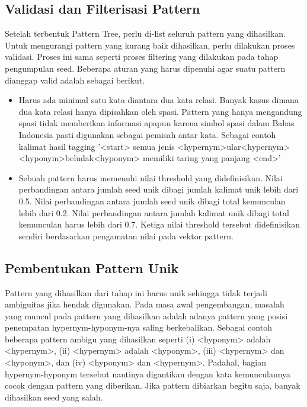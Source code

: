 \subsection{Validasi dan Filterisasi Pattern}
Setelah terbentuk Pattern Tree, perlu di-list seluruh pattern yang dihasilkan. Untuk mengurangi pattern yang kurang baik dihasilkan, perlu dilakukan proses validasi. Proses ini sama seperti proses filtering yang dilakukan pada tahap pengumpulan seed. Beberapa aturan yang harus dipenuhi agar suatu pattern dianggap valid adalah sebagai berikut.
\begin{itemize}
  \item Harus ada minimal satu kata diantara dua kata relasi. Banyak kasus dimana dua kata relasi hanya dipisahkan oleh spasi. Pattern yang hanya mengandung spasi tidak memberikan informasi apapun karena simbol spasi dalam Bahas Indonesia pasti digunakan sebagai pemisah antar kata. Sebagai contoh kalimat hasil tagging '<start> semua jenis <hypernym>ular<hypernym> <hyponym>beludak<hyponym> memiliki taring yang panjang <end>'
  \item Sebuah pattern harus memenuhi nilai threshold yang didefinisikan. Nilai perbandingan antara jumlah seed unik dibagi jumlah kalimat unik lebih dari 0.5. Nilai perbandingan antara jumlah seed unik dibagi total kemunculan lebih dari 0.2. Nilai perbandingan antara jumlah kalimat unik dibagi total kemunculan harus lebih dari 0.7. Ketiga nilai threshold tersebut didefinisikan sendiri berdasarkan pengamatan nilai pada vektor pattern.
\end{itemize}

\subsection{Pembentukan Pattern Unik}
Pattern yang dihasilkan dari tahap ini harus unik sehingga tidak terjadi ambiguitas jika hendak digunakan. Pada masa awal pengembangan, masalah yang muncul pada pattern yang dihasilkan adalah adanya pattern yang posisi penempatan hypernym-hyponym-nya saling berkebalikan. Sebagai contoh beberapa pattern ambigu yang dihasilkan seperti (i) <hyponym> adalah <hypernym>, (ii) <hypernym> adalah <hyponym>, (iii) <hypernym> dan <hyponym>, dan (iv) <hyponym> dan <hypernym>. Padahal, bagian hypernym-hyponym tersebut nantinya digantikan dengan kata kemunculannya cocok dengan pattern yang diberikan. Jika pattern dibiarkan begitu saja, banyak dihasilkan seed yang salah.

